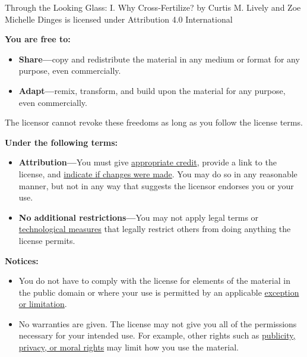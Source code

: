 \documentclass[
  letterpaper,
]{book}
\providecommand{\tightlist}{%
  \setlength{\itemsep}{0pt}\setlength{\parskip}{0pt}}\usepackage{longtable,booktabs,array}
\begin{document}
Through the Looking Glass: I. Why Cross-Fertilize? by {Curtis M. Lively
and Zoe Michelle Dinges} is licensed under Attribution 4.0 International

\textbf{You are free to:}

\begin{itemize}
\tightlist
\item
  \textbf{Share---}copy and redistribute the material in any medium or
  format for any purpose, even commercially.\\
\item
  \textbf{Adapt---}remix, transform, and build upon the material for any
  purpose, even commercially.
\end{itemize}

The licensor cannot revoke these freedoms as long as you follow the
license terms.

\textbf{Under the following terms:}

\begin{itemize}
\tightlist
\item
  \textbf{Attribution---}You must give
  \href{https://creativecommons.org/licenses/by/4.0/\#ref-appropriate-credit}{appropriate
  credit}, provide a link to the license, and
  \href{https://creativecommons.org/licenses/by/4.0/\#ref-indicate-changes}{indicate
  if changes were made}. You may do so in any reasonable manner, but not
  in any way that suggests the licensor endorses you or your use.\\
\item
  \textbf{No additional restrictions---}You may not apply legal terms or
  \href{https://creativecommons.org/licenses/by/4.0/\#ref-technological-measures}{technological
  measures} that legally restrict others from doing anything the license
  permits.
\end{itemize}

\textbf{Notices:}

\begin{itemize}
\tightlist
\item
  You do not have to comply with the license for elements of the
  material in the public domain or where your use is permitted by an
  applicable
  \href{https://creativecommons.org/licenses/by/4.0/\#ref-exception-or-limitation}{exception
  or limitation}.\\
\item
  No warranties are given. The license may not give you all of the
  permissions necessary for your intended use. For example, other rights
  such as
  \href{https://creativecommons.org/licenses/by/4.0/\#ref-publicity-privacy-or-moral-rights}{publicity,
  privacy, or moral rights} may limit how you use the material.
\end{itemize}
\end{document}
